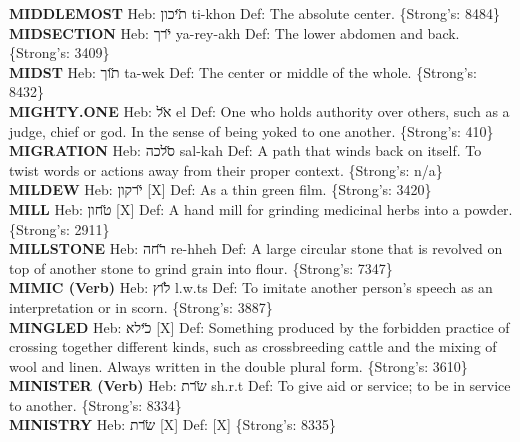 {\textbf{MIDDLEMOST} Heb: {\large\H תיכון} ti-khon Def: The absolute center. \{Strong's: 8484\}\hfill{}\\

\textbf{MIDSECTION} Heb: {\large\H ירך} ya-rey-akh Def: The lower abdomen and back. \{Strong's: 3409\}\hfill{}\\

\textbf{MIDST} Heb: {\large\H תוך} ta-wek Def: The center or middle of the whole. \{Strong's: 8432\}\hfill{}\\

\textbf{MIGHTY.ONE} Heb: {\large\H אל} el Def: One who holds authority over others, such as a judge, chief or god. In the sense of being yoked to one another. \{Strong's: 410\}\hfill{}\\

\textbf{MIGRATION} Heb: {\large\H סלכה} sal-kah Def: A path that winds back on itself. To twist words or actions away from their proper context. \{Strong's: n/a\}\hfill{}\\

\textbf{MILDEW} Heb: {\large\H ירקון} {[}X{]} Def: As a thin green film. \{Strong's: 3420\}\hfill{}\\

\textbf{MILL} Heb: {\large\H טחון} {[}X{]} Def: A hand mill for grinding medicinal herbs into a powder. \{Strong's: 2911\}\hfill{}\\

\textbf{MILLSTONE} Heb: {\large\H רחה} re-hheh Def: A large circular stone that is revolved on top of another stone to grind grain into flour. \{Strong's: 7347\}\hfill{}\\

\textbf{MIMIC (Verb)} Heb: {\large\H לוץ} l.w.ts Def: To imitate another person’s speech as an interpretation or in scorn. \{Strong's: 3887\}\hfill{}\\

\textbf{MINGLED} Heb: {\large\H כילא} {[}X{]} Def: Something produced by the forbidden practice of crossing together different kinds, such as crossbreeding cattle and the mixing of wool and linen. Always written in the double plural form. \{Strong's: 3610\}\hfill{}\\

\textbf{MINISTER (Verb)} Heb: {\large\H שרת} sh.r.t Def: To give aid or service; to be in service to another. \{Strong's: 8334\}\hfill{}\\

\textbf{MINISTRY} Heb: {\large\H שרת} {[}X{]} Def: {[}X{]} \{Strong's: 8335\}\hfill{}\\

}
